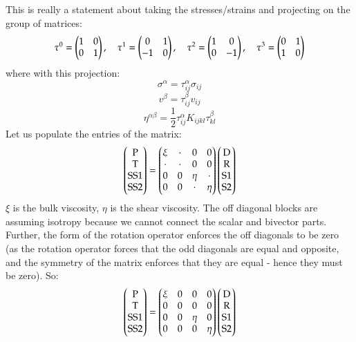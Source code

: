 This is really a statement about taking the stresses/strains and projecting on the group of matrices:
\begin{equation}
    \tau^0 = \begin{pmatrix}1 & 0 \\ 0 & 1\end{pmatrix}, \quad \tau^1 = \begin{pmatrix}0 & 1 \\ -1 & 0\end{pmatrix}, \quad \tau^2 = \begin{pmatrix}1 & 0 \\ 0 & -1\end{pmatrix}, \quad \tau^3 = \begin{pmatrix}0 & 1 \\ 1 & 0\end{pmatrix}
\end{equation}
where with this projection:
\begin{equation}
    \sigma^\alpha = \tau^\alpha_{ij}\sigma_{ij}
\end{equation}
\begin{equation}
    v^\beta = \tau_{ij}^\beta v_{ij}
\end{equation}
\begin{equation}
    \eta^{\alpha\beta} = \frac{1}{2}\tau^{\alpha}_{ij}K_{ijkl}\tau^\beta_{kl}
\end{equation}
Let us populate the entries of the matrix:
\begin{equation}
    \begin{pmatrix}\text{P} \\ \text{T} \\ \text{SS1} \\ \text{SS2}\end{pmatrix} = \begin{pmatrix}\xi & \cdot & 0 & 0 \\ \cdot & \cdot & 0 & 0 \\ 0 & 0 & \eta & \cdot \\ 0 & 0 & \cdot & \eta\end{pmatrix}\begin{pmatrix}\text{D} \\ \text{R} \\ \text{S1} \\ \text{S2}\end{pmatrix}
\end{equation}
$\xi$ is the bulk viscosity, $\eta$ is the shear viscosity. The off diagonal blocks are assuming isotropy because we cannot connect the scalar and bivector parts. Further, the form of the rotation operator enforces the off diagonals to be zero (as the rotation operator forces that the odd diagonals are equal and opposite, and the symmetry of the matrix enforces that they are equal - hence they must be zero). So:
\begin{equation}
    \begin{pmatrix}\text{P} \\ \text{T} \\ \text{SS1} \\ \text{SS2}\end{pmatrix} = \begin{pmatrix}\xi & 0 & 0 & 0 \\ 0 & 0 & 0 & 0 \\ 0 & 0 & \eta & 0 \\ 0 & 0 & 0 & \eta\end{pmatrix}\begin{pmatrix}\text{D} \\ \text{R} \\ \text{S1} \\ \text{S2}\end{pmatrix}
\end{equation}
